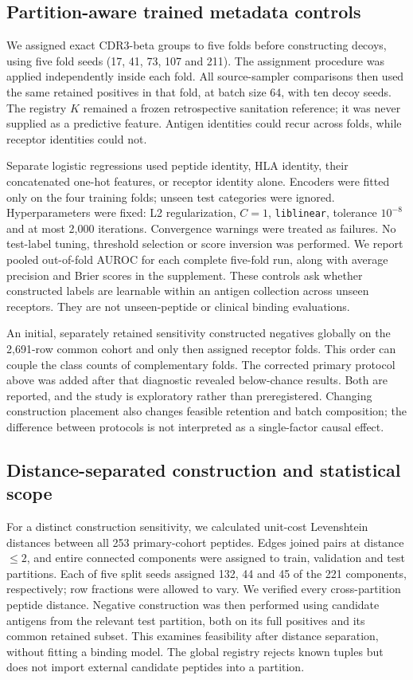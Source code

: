 \documentclass[pdflatex,sn-basic,Numbered]{sn-jnl}
\begin{document}
\subsection{Partition-aware trained metadata controls}
We assigned exact CDR3-beta groups to five folds before constructing decoys, using five fold seeds (17, 41, 73, 107 and 211). The assignment procedure was applied independently inside each fold. All source-sampler comparisons then used the same retained positives in that fold, at batch size 64, with ten decoy seeds. The registry $K$ remained a frozen retrospective sanitation reference; it was never supplied as a predictive feature. Antigen identities could recur across folds, while receptor identities could not.

Separate logistic regressions used peptide identity, HLA identity, their concatenated one-hot features, or receptor identity alone. Encoders were fitted only on the four training folds; unseen test categories were ignored. Hyperparameters were fixed: L2 regularization, $C=1$, \texttt{liblinear}, tolerance $10^{-8}$ and at most 2,000 iterations. Convergence warnings were treated as failures. No test-label tuning, threshold selection or score inversion was performed. We report pooled out-of-fold AUROC for each complete five-fold run, along with average precision and Brier scores in the supplement. These controls ask whether constructed labels are learnable within an antigen collection across unseen receptors. They are not unseen-peptide or clinical binding evaluations.

An initial, separately retained sensitivity constructed negatives globally on the 2,691-row common cohort and only then assigned receptor folds. This order can couple the class counts of complementary folds. The corrected primary protocol above was added after that diagnostic revealed below-chance results. Both are reported, and the study is exploratory rather than preregistered. Changing construction placement also changes feasible retention and batch composition; the difference between protocols is not interpreted as a single-factor causal effect.

\subsection{Distance-separated construction and statistical scope}
For a distinct construction sensitivity, we calculated unit-cost Levenshtein distances between all 253 primary-cohort peptides. Edges joined pairs at distance $\leq2$, and entire connected components were assigned to train, validation and test partitions. Each of five split seeds assigned 132, 44 and 45 of the 221 components, respectively; row fractions were allowed to vary. We verified every cross-partition peptide distance. Negative construction was then performed using candidate antigens from the relevant test partition, both on its full positives and its common retained subset. This examines feasibility after distance separation, without fitting a binding model. The global registry rejects known tuples but does not import external candidate peptides into a partition.
\end{document}

